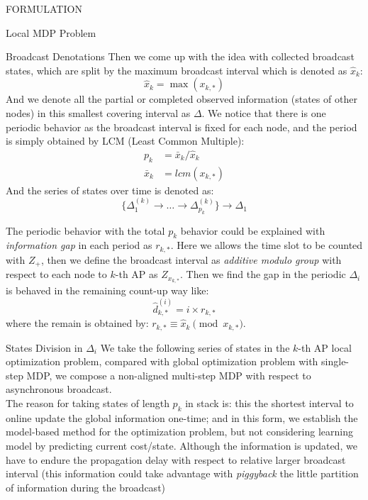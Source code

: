 \documentclass[10pt, conference, letterpaper]{IEEEtran}
\begin{document}
\begin{section}{FORMULATION}
\begin{subsection}{Local MDP Problem}
\begin{subsubsection}{Broadcast Denotations}
                Then we come up with the idea with collected broadcast states, which are split by the maximum broadcast interval which is denoted as $\hat{x}_k$:
                $$
                \hat{x}_k = \max(x_{k,*})
                $$
                And we denote all the partial or completed observed information (states of other nodes) in this smallest covering interval as $\Delta$.
                We notice that there is one periodic behavior as the broadcast interval is fixed for each node, and the period is simply obtained by LCM (Least Common Multiple):
                \begin{align*}
                    p_{k} &= \bar{x}_k/\hat{x}_k
                    \\
                    \bar{x}_k &= lcm(x_{k,*})
                \end{align*}
                And the series of states over time is denoted as:
                $$
                \{ \Delta^{(k)}_1 \to \dots \to \Delta^{(k)}_{p_k} \} \to \Delta_{1}
                $$
                
                The periodic behavior with the total $p_k$ behavior could be explained with \textit{information gap} in each period as $r_{k,*}$. Here we allows the time slot to be counted with $Z_+$, then we define the broadcast interval as \textit{additive modulo group} with respect to each node to $k$-th AP as $Z_{x_{k,*}}$. Then we find the gap in the periodic $\Delta_i$ is behaved in the remaining count-up way like:
                $$
                \hat{d}_{k,*}^{(i)} = i \times r_{k,*}
                $$
                where the remain is obtained by: $r_{k,*} \equiv \hat{x}_k \pmod{x_{k,*}}$.
            \end{subsubsection}

            \begin{subsubsection}{States Division in $\Delta_i$}
                We take the following series of states in the $k$-th AP local optimization problem, compared with global optimization problem with single-step MDP, we compose a non-aligned multi-step MDP with respect to asynchronous broadcast.
                \\
                The reason for taking states of length $p_k$ in stack is: this the shortest interval to online update the global information one-time; and in this form, we establish the model-based method for the optimization problem, but not considering learning model by predicting current cost/state. Although the information is updated, we have to endure the propagation delay with respect to relative larger broadcast interval (this information could take advantage with \emph{piggyback} the little partition of information during the broadcast)


\end{subsubsection}
\end{subsection}
\end{section}
\end{document}
